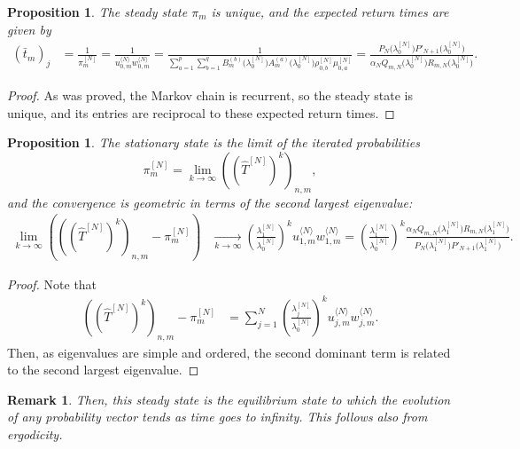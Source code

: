 \documentclass[11pt]{amsart}
\theoremstyle{plain}
\newtheorem{pro}[teo]{Proposition}
\newtheorem{rem}[teo]{Remark}
\newcommand{\1}{\text{\fontseries{bx}\selectfont \textup 1}}
\begin{document}
\begin{pro}
	The steady state $\pi_m$ is unique, and the expected return times are given by
	\begin{align*}
		(\bar t_m)_j &=\frac{1}{\pi^{[N]}_m}=\frac{1}{	u^{\langle N\rangle}_{0,m}w^{{\langle N\rangle}}_{0,m}}=\frac{1}{\sum_{a=1}^p\sum_{b=1}^q
			B_{m}^{(b)}\big(\lambda^{[N]}_0\big) A_{m}^{(a)}\big(\lambda^{[N]}_0\big)\rho^{[N]}_{0,b} \mu^{[N]}_{0,a}}= 	\frac{
			P_{N}\big(\lambda^{[N]}_0\big)P'_{N+1}\big(\lambda^{[N]}_0\big)}{ \alpha_N Q_{m,N}\big(\lambda^{[N]}_0\big)R_{m,N}\big(\lambda^{[N]}_0\big)
		}.
	\end{align*}
	
\end{pro}

\begin{proof}
	As was proved, the Markov chain is recurrent, so the steady state is unique, and its entries are reciprocal to these expected return times.
\end{proof}

\begin{pro}
	The stationary state is the limit of the iterated probabilities
	\[
	\pi^{[N]}_m=\lim_{k\to\infty} ((\hat T^{[N]})^k)_{n,m},
	\]
	and the convergence is geometric in terms of the second largest eigenvalue:
	\[
	\begin{aligned}
		\lim_{k\to\infty}\left(((\hat T^{[N]})^k)_{n,m}-\pi^{[N]}_m\right)&\xrightarrow[k\to\infty]{}
		\left(	\frac{\lambda^{[N]}_1}{\lambda^{[N]}_0}\right)^k	u^{{\langle N\rangle}}_{1,m}w^{{\langle N\rangle}}_{1,m}=	\left(	\frac{\lambda^{[N]}_1}{\lambda^{[N]}_0}\right)^k 	\frac{ \alpha_N Q_{m,N}\big(\lambda^{[N]}_1\big)R_{m,N}\big(\lambda^{[N]}_1\big)
		}{
			P_{N}\big(\lambda^{[N]}_1\big)P'_{N+1}\big(\lambda^{[N]}_1\big)}.
	\end{aligned}
	\]
\end{pro}
\begin{proof}
	Note that
	\[
	\begin{aligned}
		((\hat T^{[N]})^k)_{n,m}-\pi^{[N]}_m&=
		\sum_{j=1}^{N}
		\left(	\frac{\lambda^{[N]}_j}{\lambda^{[N]}_0}\right)^k	u^{{\langle N\rangle}}_{j,m}w^{{\langle N\rangle}}_{j,m}.
	\end{aligned}
	\]
	Then, as eigenvalues are simple and ordered, the second dominant term is related to the second largest eigenvalue.
\end{proof}

\begin{rem}
	Then, this steady state is the equilibrium state to which the evolution of any probability vector tends as time goes to infinity. This follows also from ergodicity.
\end{rem}
\end{document}
